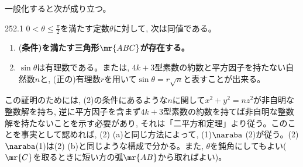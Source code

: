 一般化すると次が成り立つ。
\begin{subthm}{252.1}
$0< \theta  \leq \frac{\pi}{2}$を満たす定数$\theta$に対して, 次は同値である。
 \begin{enumerate}
  \item (\bf{条件})を満たす三角形$\mr{ABC}$が存在する。
  \item $\sin{\theta}$は有理数である。または, $4k+3$型素数の約数と平方因子を持たない自然数$n$と, (正の)有理数$r$を用いて$\sin{\theta} = r\sqrt{n}$と表すことが出来る。
 \end{enumerate}
\end{subthm}
この証明のためには, (2)の条件にあるような$n$に関して$x^2 + y^2 = nz^2$が非自明な整数解を持ち, 逆に平方因子を含まず$4k+3$型素数の約数を持てば非自明な整数解を持たないことを示す必要があり, それは「二平方和定理」より従う。このことを事実として認めれば, (2) (a)と同じ方法によって, (1)$\naraba$ (2)が従う。(2)$\naraba$(1)は(2) (b)と同じような構成で分かる。また, $\theta$を鈍角にしてもよい($\mr{C}$を取るときに短い方の弧$\mr{AB}$から取ればよい)。
